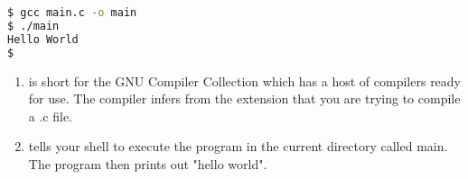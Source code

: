 \begin{lstlisting}[language=bash]
$ gcc main.c -o main
$ ./main
Hello World
$
\end{lstlisting}

\begin{enumerate}
	\item {} is short for the GNU Compiler Collection which has a host of compilers ready for use. The compiler infers from the extension that you are trying to compile a .c file.
	\item {} tells your shell to execute the program in the current directory called main. The program then prints out "hello world".
\end{enumerate}


